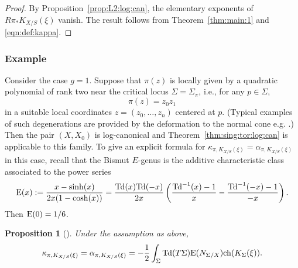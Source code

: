 \documentclass[amscd, leqno]{amsart}
\theoremstyle{plain}
\newtheorem{proposition}[theorem]{Proposition}
\theoremstyle{definition}
\theoremstyle{remark}
\newenvironment{pf}{\begin{proof}}{\end{proof}}
\begin{document}
\begin{pf}
By Proposition~\ref{prop:L2:log:can}, the elementary exponents of $R\pi_{*}K_{X/S}(\xi)$ vanish. The result follows from Theorem~\ref{thm:main:1} and \eqref{eqn:def:kappa}.
\end{pf}



\subsubsection
{Example}
\label{sect:5.3.4}
\par
Consider the case $g=1$.
Suppose that $\pi(z)$ is locally given by a quadratic polynomial of rank two near the critical locus $\Sigma=\Sigma_{\pi}$, i.e.,
for any $p \in \Sigma$,
$$
\pi(z) = z_{0}z_{1}
$$
in a suitable local coordinates $z=(z_{0}, \ldots, z_{n})$ centered at $p$. 
(Typical examples of such degenerations are provided by the deformation to the normal cone e.g. \cite[Sect.\,8 a)]{Bismut97}.) 
Then the pair $(X, X_{0})$ is log-canonical and Theorem~\ref{thm:sing:tor:log:can} is applicable to this family.
To give an explicit formula for $\kappa_{\pi, K_{X/S}(\xi)} = \alpha_{\pi, K_{X/S}(\xi)}$ in this case, recall that the Bismut $E$-genus
\cite[Def.\,5.1, Prop.\,5.2]{Bismut97} is the additive characteristic class associated to the power series
$$
{\rm E}(x) := \frac{x - {\rm sinh}(x)}{2x(1-{\rm cosh}(x))}
= \frac{{\rm Td}(x){\rm Td}(-x)}{2x} \left( \frac{{\rm Td}^{-1}(x)-1}{x} - \frac{{\rm Td}^{-1}(-x)-1}{-x} \right).
$$
Then ${\rm E}(0) = 1/6$.


\begin{proposition}[\cite{Bismut97}]
\label{prop:kappa:q:rk2}
Under the assumption as above, %
$$
\kappa_{\pi, K_{X/S}(\xi)} = \alpha_{\pi, K_{X/S}(\xi)} 
= -\frac{1}{2} \int_{\Sigma} {\rm Td}(T\Sigma) {\rm E}(N_{\Sigma/X}) {\rm ch}(K_{\Sigma}(\xi)).
$$
\end{proposition}
\end{document}

